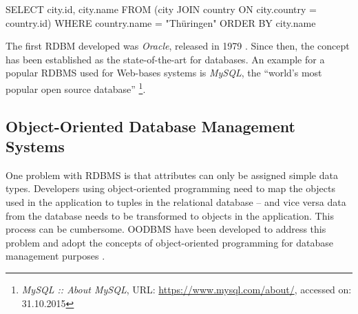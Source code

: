 \vspace{-1em}
\begin{verbatimtab}
  SELECT     city.id, city.name
  FROM       (city JOIN country ON city.country = country.id)
  WHERE      country.name = "Thüringen"
  ORDER BY   city.name
\end{verbatimtab}
\vspace{-1em}

The first RDBM developed was \emph{Oracle}, released in 1979 \cite{oracleDB}. Since then, the concept has been established as the state-of-the-art for databases. An example for a popular RDBMS used for Web-bases systems is \emph{MySQL}, the ``world's most popular open source database''
\footnote{
  \emph{MySQL :: About MySQL},
  URL: \url{https://www.mysql.com/about/},
  accessed on: 31.10.2015
}.



\subsection{Object-Oriented Database Management Systems} %
\label{sub:object_oriented_database_management_systems}

One problem with RDBMS is that attributes can only be assigned simple data types. Developers using object-oriented programming need to map the objects used in the application to tuples in the relational database -- and vice versa data from the database needs to be transformed to objects in the application. This process can be cumbersome. OODBMS have been developed to address this problem and adopt the concepts of object-oriented programming for database management purposes \cite{oodbms}.


